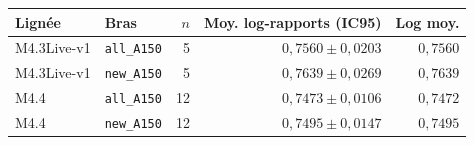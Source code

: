 \begin{longtable}{@{}llrrr@{}}
\toprule
Lignée & Bras & $n$ & Moy. log-rapports (IC95) & Log moy. \\
\midrule
\endhead
M4.3Live-v1 & \texttt{all\_A150} & 5 & $0{,}7560\pm0{,}0203$ & $0{,}7560$ \\
M4.3Live-v1 & \texttt{new\_A150} & 5 & $0{,}7639\pm0{,}0269$ & $0{,}7639$ \\
M4.4 & \texttt{all\_A150} & 12 & $0{,}7473\pm0{,}0106$ & $0{,}7472$ \\
M4.4 & \texttt{new\_A150} & 12 & $0{,}7495\pm0{,}0147$ & $0{,}7495$ \\
\bottomrule
\end{longtable}
